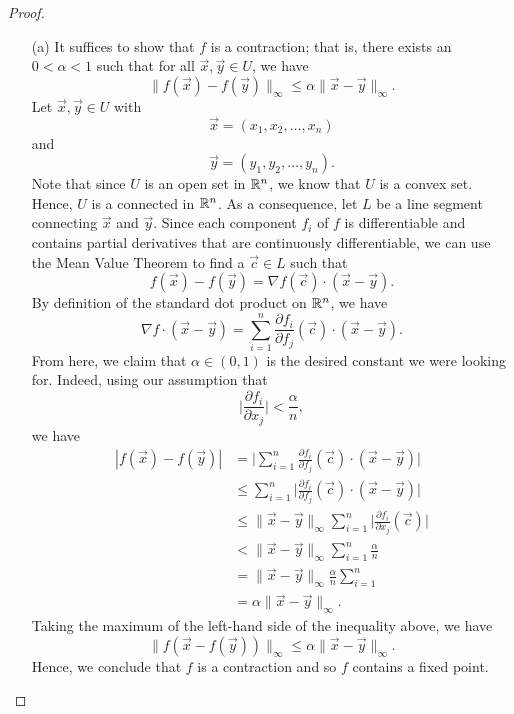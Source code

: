 \documentclass[a4paper]{article}
\begin{document}
\begin{proof}
\begin{enumerate}
    \item[(a)] 
It suffices to show that \( f  \) is a contraction; that is, there exists an \( 0 < \alpha < 1  \) such that for all \( \vec{ x } , \vec{ y }  \in U  \), we have 
\[  \|f(\vec{ x }) - f(\vec{ y } )\|_{\infty } \leq \alpha \|\vec{ x }  -\vec{ y } \|_{\infty }. \]
Let \( \vec{ x } ,\vec{ y }  \in U  \) with 
\[  \vec{ x  }  = ({x}_{1}, {x}_{2}, \dots , {x}_{n}) \]
and 
\[  \vec{ y  }  = ({y}_{1}, {y}_{2}, \dots, {y}_{n}). \]
Note that since \( U  \) is an open set in \( \mathbb{R}^{n} \), we know that \(  U \) is a convex set. Hence, \( U  \) is a connected in \( \mathbb{R}^{n} \). As a consequence, let \( L  \) be a line segment connecting \( \vec{ x }  \) and \( \vec{ y }  \). Since each component \( {f}_{i} \) of \( f  \) is differentiable and contains partial derivatives that are continuously differentiable, we can use the Mean Value Theorem to find a \( \vec{ c }  \in L  \) such that 
\[  f(\vec{ x } ) - f(\vec{ y } ) = \nabla f(\vec{ c }) \cdot (\vec{ x }  - \vec{ y }). \]
By definition of the standard dot product on \( \mathbb{R}^{n} \), we have
\[  \nabla f \cdot (\vec{ x }  - \vec{ y } ) = \sum_{ i= 1   }^{ n } \frac{\partial {f}_{i} }{\partial {f}_{j} } (\vec{ c } ) \cdot (\vec{ x }  - \vec{ y } ).  \]
From here, we claim that \( \alpha \in (0,1) \) is the desired constant we were looking for.
Indeed, using our assumption that 
\[  \Big| \frac{\partial {f}_{i} }{\partial {x}_{j} }  \Big|  < \frac{ \alpha }{ n },  \]
we have
\begin{align*}
    | f(\vec{ x } ) - f(\vec{ y } ) | &= \Big| \sum_{ i=1  }^{ n } \frac{\partial {f}_{i}  }{\partial {f}_{j} } (\vec{ c } ) \cdot (\vec{ x } -  \vec{ y } ) \Big|  \\
                                      &\leq \sum_{ i=1  }^{ n } \Big| \frac{\partial {f}_{i} }{\partial {f}_{j} } (\vec{ c } ) \cdot (\vec{ x  } - \vec{ y }) \Big| \\
                                      &\leq \| \vec{ x  }  - \vec{ y } \|_{\infty } \sum_{ i=1  }^{ n } \Big| \frac{\partial {f}_{i} }{\partial {x}_{j} } (\vec{ c } ) \Big| \\
                                      &< \|\vec{ x }  -\vec{ y } \|_{\infty } \sum_{ i=1  }^{ n } \frac{ \alpha }{ n } \\
                                      &= \|\vec{ x }  - \vec{ y } \|_{\infty } \frac{ \alpha }{ n }  \sum_{ i=1  }^{ n } \\
                                      &= \alpha \|\vec{ x }  - \vec{ y } \|_{\infty }.
\end{align*}
Taking the maximum of the left-hand side of the inequality above, we have  
\[  \|f(\vec{ x }  - f(\vec{ y } ))\|_{\infty } \leq \alpha \|\vec{ x }  - \vec{ y } \|_{\infty }.  \]
Hence, we conclude that \( f  \) is a contraction and so \( f \) contains a fixed point.


\end{enumerate}
\end{proof}
\end{document}

